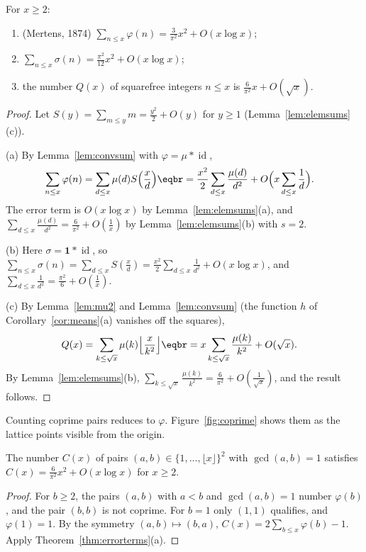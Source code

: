 \begin{theorem}\label{thm:errorterms}
For $x\ge2$:
\begin{enumerate}[label=(\alph*)]
\item (Mertens, 1874) $\displaystyle\sum_{n\le x}\varphi(n)=\frac3{\pi^2}x^2+O(x\log x)$;
\item $\displaystyle\sum_{n\le x}\sigma(n)=\frac{\pi^2}{12}x^2+O(x\log x)$;
\item the number $Q(x)$ of squarefree integers $n\le x$ is $\frac6{\pi^2}x+O(\sqrt x)$.
\end{enumerate}
\end{theorem}
\begin{proof}
Let $S(y)=\sum_{m\le y}m=\frac{y^2}2+O(y)$ for $y\ge1$ (Lemma~\ref{lem:elemsums}(c)).

(a) By Lemma~\ref{lem:convsum} with $\varphi=\mu*\operatorname{id}$,
\[
\begin{aligned}\sum_{n\le x}\varphi(n)&=\sum_{d\le x}\mu(d)S\Bigl(\frac xd\Bigr)\eqbr=\frac{x^2}2\sum_{d\le x}\frac{\mu(d)}{d^2}+O\Bigl(x\sum_{d\le x}\frac1d\Bigr).\end{aligned}
\]
The error term is $O(x\log x)$ by Lemma~\ref{lem:elemsums}(a), and $\sum_{d\le x}\frac{\mu(d)}{d^2}=\frac6{\pi^2}+O(\frac1x)$ by Lemma~\ref{lem:elemsums}(b) with $s=2$.

(b) Here $\sigma=\mathbf1*\operatorname{id}$, so $\sum_{n\le x}\sigma(n)=\sum_{d\le x}S(\frac xd)=\frac{x^2}2\sum_{d\le x}\frac1{d^2}+O(x\log x)$, and $\sum_{d\le x}\frac1{d^2}=\frac{\pi^2}6+O(\frac1x)$.

(c) By Lemma~\ref{lem:mu2} and Lemma~\ref{lem:convsum} (the function $h$ of Corollary~\ref{cor:means}(a) vanishes off the squares),
\[
\begin{aligned}Q(x)&=\sum_{k\le\sqrt x}\mu(k)\Bigl\lfloor\frac x{k^2}\Bigr\rfloor\eqbr=x\sum_{k\le\sqrt x}\frac{\mu(k)}{k^2}+O(\sqrt x).\end{aligned}
\]
By Lemma~\ref{lem:elemsums}(b), $\sum_{k\le\sqrt x}\frac{\mu(k)}{k^2}=\frac6{\pi^2}+O(\frac1{\sqrt x})$, and the result follows.
\end{proof}

Counting coprime pairs reduces to $\varphi$. Figure~\ref{fig:coprime} shows them as the lattice points visible from the origin.

\begin{corollary}\label{cor:coprimepairs}
The number $C(x)$ of pairs $(a,b)\in\{1,\dots,\lfloor x\rfloor\}^2$ with $\gcd(a,b)=1$ satisfies $C(x)=\frac6{\pi^2}x^2+O(x\log x)$ for $x\ge2$.
\end{corollary}
\begin{proof}
For $b\ge2$, the pairs $(a,b)$ with $a<b$ and $\gcd(a,b)=1$ number $\varphi(b)$, and the pair $(b,b)$ is not coprime. For $b=1$ only $(1,1)$
qualifies, and $\varphi(1)=1$. By the symmetry $(a,b)\mapsto(b,a)$, $C(x)=2\sum_{b\le x}\varphi(b)-1$. Apply Theorem~\ref{thm:errorterms}(a).
\end{proof}

